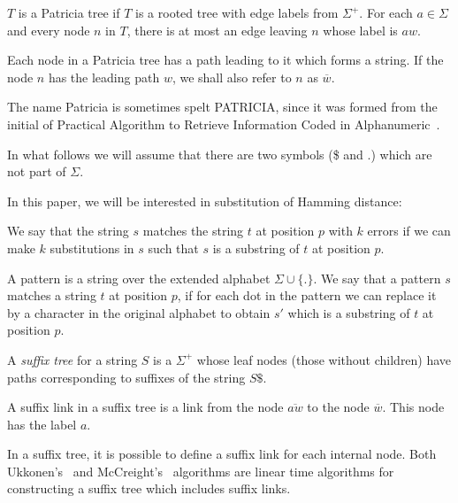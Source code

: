 \begin{definition}
$T$ is a Patricia tree if $T$ is a rooted tree with edge labels from $\Sigma^+$. For each $a \in \Sigma$ and every node $n$ in $T$, there is at most an edge leaving $n$ whose label is $aw$.

Each node in a Patricia tree has a path leading to it which forms a string. If the node $n$ has the leading path $w$, we shall also refer to $n$ as $\overline{w}$.
\end{definition}

The name Patricia is sometimes spelt PATRICIA, since it was formed from the initial of Practical Algorithm to Retrieve Information Coded in Alphanumeric~\cite{morrison:patricia}.

In what follows we will assume that there are two symbols (\$ and $.$) which are not part of $\Sigma$.

In this paper, we will be interested in substitution of Hamming distance:

\begin{definition}
We say that the string $s$ matches the string $t$ at position $p$ with $k$ errors if we can make $k$ substitutions in $s$ such that $s$ is a substring of $t$ at position $p$.
\end{definition}


\begin{definition}[Pattern]
A pattern is a string over the extended alphabet $\Sigma\cup\{.\}$. We say that a pattern $s$ matches a string $t$ at position $p$, if for each dot in the pattern we can replace it by a character in the original alphabet to obtain $s'$ which is a substring of $t$ at position $p$.
\end{definition}

\begin{definition}
A \emph{suffix tree} for a string $S$ is a $\Sigma^+$ whose leaf nodes (those without children) have paths corresponding to suffixes of the string $S\$ $.
\end{definition}

\begin{definition}
A suffix link in a suffix tree is a link from the node $\overline{aw}$ to the node $\overline{w}$. This node has the label $a$.
\end{definition}

In a suffix tree, it is possible to define a suffix link for each internal node. Both Ukkonen's~\cite{ukkonen} and McCreight's~\cite{mccreight} algorithms are linear time algorithms for constructing a suffix tree which includes suffix links.

